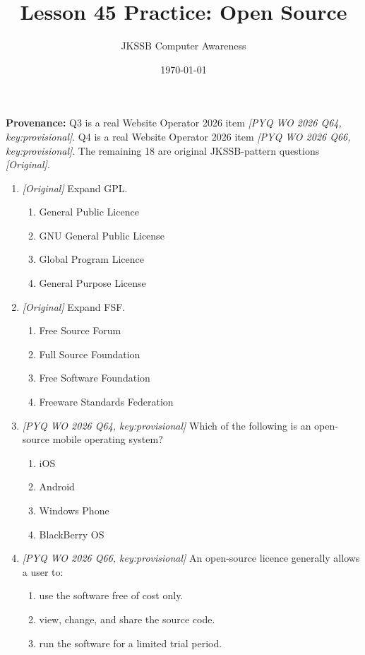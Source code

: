 \documentclass[11pt]{article}
\title{Lesson 45 Practice: Open Source}
\author{JKSSB Computer Awareness}
\date{\today}
\begin{document}
\maketitle
\noindent\textbf{Provenance:} Q3 is a real Website Operator 2026 item
\textit{[PYQ WO 2026 Q64, key:provisional]}. Q4 is a real Website Operator 2026
item \textit{[PYQ WO 2026 Q66, key:provisional]}. The remaining 18 are original
JKSSB-pattern questions \textit{[Original]}.

\begin{enumerate}[label=\textbf{Q\arabic*.}, leftmargin=*]
\item \textit{[Original]} Expand GPL.
  \begin{enumerate}[label=\Alph*.]
    \item General Public Licence
    \item GNU General Public License
    \item Global Program Licence
    \item General Purpose License
  \end{enumerate}
\item \textit{[Original]} Expand FSF.
  \begin{enumerate}[label=\Alph*.]
    \item Free Source Forum
    \item Full Source Foundation
    \item Free Software Foundation
    \item Freeware Standards Federation
  \end{enumerate}
\item \textit{[PYQ WO 2026 Q64, key:provisional]} Which of the following is an
  open-source mobile operating system?
  \begin{enumerate}[label=\Alph*.]
    \item iOS
    \item Android
    \item Windows Phone
    \item BlackBerry OS
  \end{enumerate}
\item \textit{[PYQ WO 2026 Q66, key:provisional]} An open-source licence
  generally allows a user to:
  \begin{enumerate}[label=\Alph*.]
    \item use the software free of cost only.
    \item view, change, and share the source code.
    \item run the software for a limited trial period.

\end{enumerate}
\end{enumerate}
\end{document}
